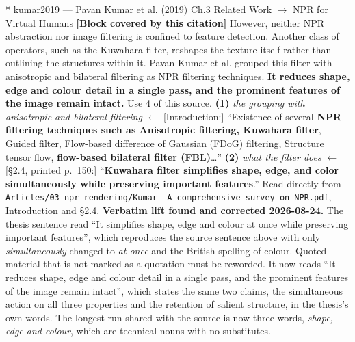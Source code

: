 \documentclass[11pt, a4paper]{article}
\makeatletter
\newcounter{citentry}
\newcommand{\citentry@core}[7]{%
  \stepcounter{citentry}
  \begingroup
  \sbox{\citentry@measurebox}{%
    \begin{minipage}{\linewidth}
      \noindent\colorbox{konstanzblue}{\parbox{\dimexpr\linewidth-2\fboxsep}{%
        \vspace{3pt}
        \textbf{\#\thecitentry \quad #2} \hfill \textit{#3}
        \vspace{3pt}
      }}
      \vspace{3pt}
      \noindent\begin{tabular}{@{}p{2.7cm} p{\dimexpr\linewidth-3cm}@{}}
        \textit{\small Sentence in thesis:} & #4 \\[5pt]
        \textbf{Usage:}\hfill       & #5 \\[5pt]
        \textit{\small Original source:}     & #6 \\[5pt]
        \textbf{How to check:}             & #7 \\
      \end{tabular}
      \vspace{5pt}
      \rule{10pt}{10pt}\quad \textbf{Validated} --- I have read the original and agree it supports the sentence.
    \end{minipage}%
  }%
  \Needspace{\dimexpr\ht\citentry@measurebox+\dp\citentry@measurebox\relax}%
  \endgroup
  \vspace{10pt}
  \noindent\colorbox{konstanzblue}{\parbox{\dimexpr\linewidth-2\fboxsep}{%
    \vspace{3pt}
    \textcolor{white}{\textbf{\#\thecitentry \quad #2}} \hfill \textcolor{white}{\textit{#3}}
    \vspace{3pt}
  }}
  \vspace{3pt}
  \noindent\begin{tabular}{@{}p{2.7cm} p{\dimexpr\linewidth-3cm}@{}}
    \textit{\small Sentence in thesis:} & \textcolor{darkgreen}{#4} \\[5pt]
    \textbf{Usage:}\hfill       & #5 \\[5pt]
    \textit{\small Original source:}     & \textcolor{darkred}{#6} \\[5pt]
    \textbf{How to check:}             & #7 \\
  \end{tabular}
  \vspace{5pt}
  \noindent\CheckBox[name=verified\thecitentry, width=10pt, height=10pt, bordercolor={0 0 0}, borderwidth=0.75, backgroundcolor={1 1 1}#1]{}\quad \textbf{Validated} --- I have read the original and agree it supports the sentence.
  \vspace{3pt}
  \noindent\textcolor{midgray}{\rule{\linewidth}{0.4pt}}
}
\newcommand{\citentry}{\@ifstar{\citentry@core{, checked}}{\citentry@core{}}}
\makeatother
\begin{document}
\begin{Form}
\citentry*
  {kumar2019 --- Pavan Kumar et al. (2019)}
  {Ch.3 Related Work $\rightarrow$ NPR for Virtual Humans}
  {\textbf{[Block covered by this citation]} However, neither NPR abstraction nor image filtering is confined to feature detection. Another class of operators, such as the Kuwahara filter, reshapes the texture itself rather than outlining the structures within it. Pavan Kumar et al. grouped this filter with anisotropic and bilateral filtering as NPR filtering techniques. \textbf{It reduces shape, edge and colour detail in a single pass, and the prominent features of the image remain intact.}}
  {Use 4 of this source.}
  {\textbf{(1)} \emph{the grouping with anisotropic and bilateral filtering} $\leftarrow$ [Introduction:] ``Existence of several \textbf{NPR filtering techniques such as Anisotropic filtering, Kuwahara filter}, Guided filter, Flow-based difference of Gaussian (FDoG) filtering, Structure tensor flow, \textbf{flow-based bilateral filter (FBL)}\ldots'' \quad \textbf{(2)} \emph{what the filter does} $\leftarrow$ [\S2.4, printed p.~150:] ``\textbf{Kuwahara filter simplifies shape, edge, and color simultaneously while preserving important features}.''}
  {Read directly from \texttt{\footnotesize Articles/03\_npr\_rendering/Kumar- A comprehensive survey on NPR.pdf}, Introduction and \S2.4. \textbf{Verbatim lift found and corrected 2026-08-24.} The thesis sentence read ``It simplifies shape, edge and colour at once while preserving important features'', which reproduces the source sentence above with only \emph{simultaneously} changed to \emph{at once} and the British spelling of colour. Quoted material that is not marked as a quotation must be reworded. It now reads ``It reduces shape, edge and colour detail in a single pass, and the prominent features of the image remain intact'', which states the same two claims, the simultaneous action on all three properties and the retention of salient structure, in the thesis's own words. The longest run shared with the source is now three words, \emph{shape, edge and colour}, which are technical nouns with no substitutes.}


\end{Form}
\end{document}
